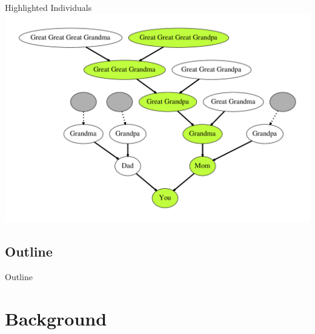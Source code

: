 \documentclass{beamer}
\begin{document}
\begin{frame}{Highlighted Individuals}
\includegraphics[width=\textwidth]{Illustrations/family_path.pdf} 
\end{frame}

\subsection*{Outline}

\begin{frame}{Outline}
  \tableofcontents[hideallsubsections]
\end{frame}


\section[Background]{Background}
\end{document}
